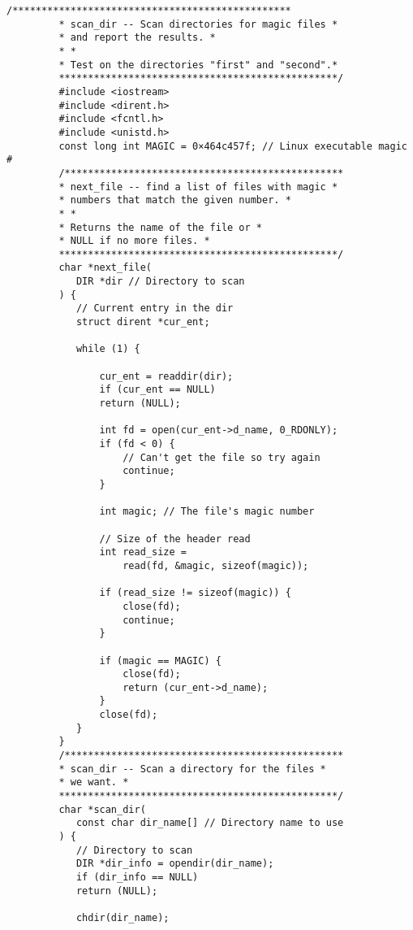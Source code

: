 \begin{LTR}
    \begin{lstlisting}[style=C++Style]
         /************************************************
         * scan_dir -- Scan directories for magic files *
         * and report the results. *
         * *
         * Test on the directories "first" and "second".*
         ************************************************/
         #include <iostream>
         #include <dirent.h>
         #include <fcntl.h>
         #include <unistd.h>
         const long int MAGIC = 0×464c457f; // Linux executable magic #
         /************************************************
         * next_file -- find a list of files with magic *
         * numbers that match the given number. *
         * *
         * Returns the name of the file or *
         * NULL if no more files. *
         ************************************************/
         char *next_file(
         	DIR *dir // Directory to scan
         ) {
         	// Current entry in the dir
         	struct dirent *cur_ent;

         	while (1) {

         		cur_ent = readdir(dir);
         		if (cur_ent == NULL)
         		return (NULL);

         		int fd = open(cur_ent->d_name, 0_RDONLY);
         		if (fd < 0) {
         			// Can't get the file so try again
         			continue;
         		}

         		int magic; // The file's magic number

         		// Size of the header read
         		int read_size =
         			read(fd, &magic, sizeof(magic));

         		if (read_size != sizeof(magic)) {
         			close(fd);
         			continue;
         		}

         		if (magic == MAGIC) {
         			close(fd);
         			return (cur_ent->d_name);
         		}
         		close(fd);
         	}
         }
         /************************************************
         * scan_dir -- Scan a directory for the files *
         * we want. *
         ************************************************/
         char *scan_dir(
         	const char dir_name[] // Directory name to use
         ) {
         	// Directory to scan
         	DIR *dir_info = opendir(dir_name);
         	if (dir_info == NULL)
         	return (NULL);

         	chdir(dir_name);


\end{lstlisting}
\end{LTR}
